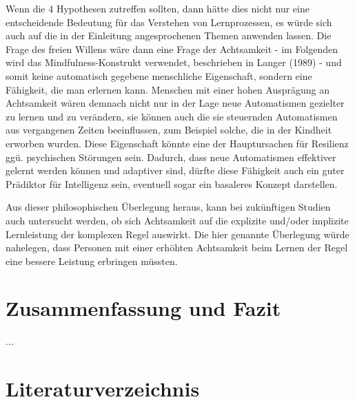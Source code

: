 \documentclass[doc,a4paper,12pt]{apa6}
\begin{document}
Wenn die 4 Hypothesen zutreffen sollten, dann hätte dies nicht nur eine entscheidende Bedeutung für das Verstehen von Lernprozessen, es würde sich auch auf die in der Einleitung angesprochenen Themen anwenden lassen. Die Frage des freien Willens wäre dann eine Frage der Achtsamkeit - im Folgenden wird das Mindfulness-Konstrukt verwendet, beschrieben in Langer (1989) - und somit keine automatisch gegebene menschliche Eigenschaft, sondern eine Fähigkeit, die man erlernen kann. Menschen mit einer hohen Ausprägung an Achtsamkeit wären demnach nicht nur in der Lage neue Automatismen gezielter zu lernen und zu verändern, sie können auch die sie steuernden Automatismen aus vergangenen Zeiten beeinflussen, zum Beispiel solche, die in der Kindheit erworben wurden. Diese Eigenschaft könnte eine der Hauptursachen für Resilienz ggü. psychischen Störungen sein. Dadurch, dass neue Automatismen effektiver gelernt werden können und adaptiver sind, dürfte diese Fähigkeit auch ein guter Prädiktor für Intelligenz sein, eventuell sogar ein basaleres Konzept darstellen.

Aus dieser philosophischen Überlegung heraus, kann bei zukünftigen Studien auch untersucht werden, ob sich Achtsamkeit auf die explizite und/oder implizite Lernleistung der komplexen Regel auswirkt. Die hier genannte Überlegung würde nahelegen, dass Personen mit einer erhöhten Achtsamkeit beim Lernen der Regel eine bessere Leistung erbringen müssten.


\section{Zusammenfassung und Fazit}

...

\section{Literaturverzeichnis}

\printbibliography[heading=none]
\end{document}
